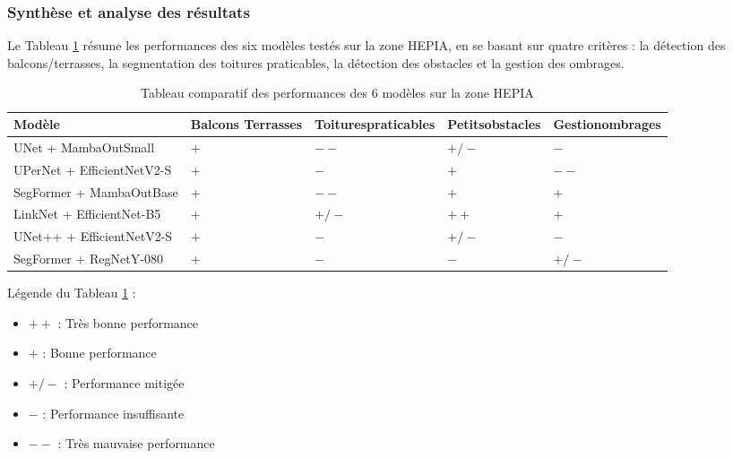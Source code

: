 
\subsubsection{Synthèse et analyse des résultats}

Le Tableau \ref{tab:quartier_hepia_comparatif_modeles} résume les performances des six modèles testés sur la zone HEPIA, en se basant sur quatre critères : la détection des balcons/terrasses, la segmentation des toitures praticables, la détection des obstacles et la gestion des ombrages.

\begin{table}[H]
\centering
\begin{tabularx}{\textwidth}{|l|X|X|X|X|}
\hline
Modèle & {Balcons \newline Terrasses} & {Toitures\newline praticables} & {Petits\newline obstacles} & {Gestion\newline ombrages} \\
\hline
UNet + MambaOutSmall & $+$ & $--$ & $+/-$ & $-$ \\
\hline
UPerNet + EfficientNetV2-S & $+$ & $-$ & $+$ & $--$ \\
\hline
SegFormer + MambaOutBase & $+$ & $--$ & $+$ & $+$ \\
\hline
LinkNet + EfficientNet-B5 & $+$ & $+/-$ & $++$ & $+$ \\
\hline
UNet++ + EfficientNetV2-S & $+$ & $-$ & $+/-$ & $-$ \\
\hline
SegFormer + RegNetY-080 & $+$ & $-$ & $-$ & $+/-$ \\
\hline
\end{tabularx}
\caption{Tableau comparatif des performances des 6 modèles sur la zone HEPIA}
\label{tab:quartier_hepia_comparatif_modeles}
\end{table}

Légende du Tableau \ref{tab:quartier_hepia_comparatif_modeles} :
\begin{itemize}[label={}]
\item $++$ : Très bonne performance
\item $+$ : Bonne performance
\item $+/-$ : Performance mitigée
\item $-$ : Performance insuffisante
\item $--$ : Très mauvaise performance
\end{itemize}

